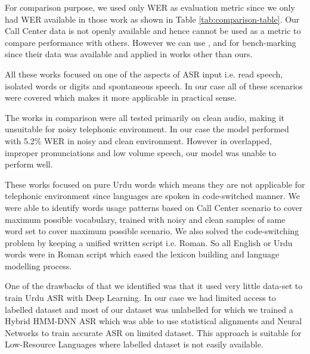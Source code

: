 For comparison purpose, we used only WER as evaluation metric since we only had WER available in those work as shown in Table \ref{tab:comparison-table}. Our Call Center data is not openly available and hence cannot be used as a metric to compare performance with others. However we can use \cite{ali_automatic_2015}, \cite{sehar_gul_detecting_2020} and \cite{qureshi_urdu_2021} for bench-marking since their data was available and applied in works other than ours. 


All these works focused on one of the aspects of ASR input i.e. read speech, isolated words or digits and spontaneous speech. In our case all of these scenarios were covered which makes it more applicable in practical sense.

The works in comparison were all tested primarily on clean audio, making it unsuitable for noisy telephonic environment. In our case the model performed with 5.2\% WER in noisy and clean environment. However in overlapped, improper pronunciations and low volume speech, our model was unable to perform well.

These works focused on pure Urdu words which means they are not applicable for telephonic environment since languages are spoken in code-switched manner. We were able to identify words usage patterns based on Call Center scenario to cover maximum possible vocabulary, trained with noisy and clean samples of same word set to cover maximum possible scenario. We also solved the code-switching problem by keeping a unified written script i.e. Roman. So all English or Urdu words were in Roman script which eased the lexicon building and language modelling process. 

One of the drawbacks of \cite{sehar_gul_detecting_2020} that we identified was that it used very little data-set to train Urdu ASR with Deep Learning. In our case we had limited access to labelled dataset and most of our dataset was unlabelled for which we trained a Hybrid HMM-DNN ASR which was able to use statistical alignments and Neural Networks to train accurate ASR on limited dataset. This approach is suitable for Low-Resource Languages where labelled dataset is not easily available.


